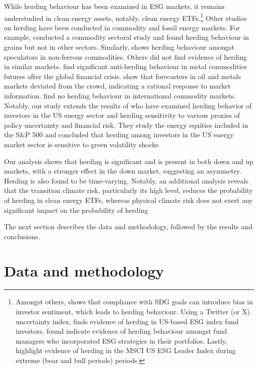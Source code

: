 \documentclass[
  letterpaper,
  DIV=11,
  numbers=noendperiod]{scrartcl}
\begin{document}
While herding behaviour has been examined in ESG markets, it remains
understudied in clean energy assets, notably, clean energy
ETFs.\footnote{Amongst others, \citet{loang2023} shows that compliance
  with SDG goals can introduce bias in investor sentiment, which leads
  to herding behaviour. Using a Twitter (or X) uncertainty index,
  \citet{koutmos2024} finds evidence of herding in US-based ESG index
  fund investors. \citet{przychodzen2016} found indicate evidence of
  herding behaviour amongst fund managers who incorporated ESG
  strategies in their portfolios. Lastly, \citet{rubbaniy2021} highlight
  evidence of herding in the MSCI US ESG Leader Index during extreme
  (bear and bull periods) periods.} Other studies on herding have been
conducted in commodity and fossil energy markets. For example,
\citet{demirer2013} conducted a commodity sectoral study and found
herding behaviour in grains but not in other sectors. Similarly,
\citet{gilbert2010} shows herding behaviour amongst speculators in
non-ferrous commodities. Others did not find evidence of herding in
similar markets. \citet{babalos2015} find significant anti-herding
behaviour in metal commodities futures after the global financial
crisis. \citet{pierdzioch2010} show that forecasters in oil and metals
markets deviated from the crowd, indicating a rational response to
market information. \citet{steen2013} find no herding behaviour in
international commodity markets. Notably, our study extends the results
of \citet{dragomirescu-gaina2021} who have examined herding behavior of
investors in the US energy sector and herding sensitivity to various
proxies of policy uncertainty and financial risk. They study the energy
equities included in the S\&P 500 and concluded that herding among
investors in the US energy market sector is sensitive to green
volatility shocks

Our analysis shows that herding is significant and is present in both
down and up markets, with a stronger effect in the down market,
suggesting an asymmetry. Herding is also found to be time-varying.
Notably, an additional analysis reveals that the transition climate
risk, particularly its high level, reduces the probability of herding in
clean energy ETFs, whereas physical climate risk does not exert any
significant impact on the probability of herding

The next section describes the data and methodology, followed by the
results and conclusions.

\section{Data and methodology}\label{data-and-methodology}
\end{document}
